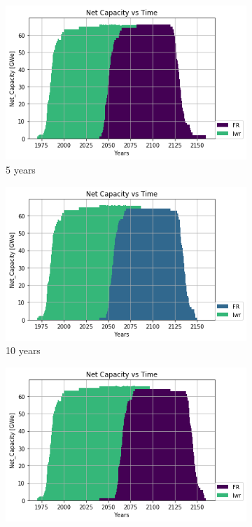 \iffalse
\begin{figure}[htbp]
    \centering
    \begin{subfigure}[b]{0.4\textwidth}
        \includegraphics[width=\textwidth]{./images/sensitivity/5.png}
        \caption{5 years}
    \end{subfigure}
    \begin{subfigure}[b]{0.4\textwidth}
        \includegraphics[width=\textwidth]{./images/sensitivity/10.png}
        \caption{10 years}
    \end{subfigure}
    \begin{subfigure}[b]{0.4\textwidth}
        \includegraphics[width=\textwidth]{./images/sensitivity/20.png}

\end{subfigure}
\end{figure}
